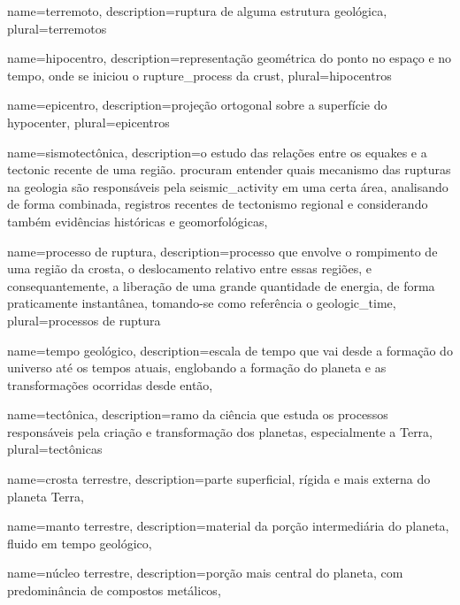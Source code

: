 {
	name={terremoto},
	description={ruptura de alguma estrutura geológica},
	plural={terremotos}
}

{
	name={hipocentro},
	description={representação geométrica do ponto no espaço e no tempo, onde 
		se iniciou o \gls{rupture_process} da \gls{crust}},
	plural={hipocentros}
}

{
	name={epicentro},
	description={projeção ortogonal sobre a superfície do \gls{hypocenter}},
	plural={epicentros}
}


{
	name={sismotectônica},
	description={o estudo das relações entre os \glspl{equake} e a \gls{tectonic} recente de uma região.
				 procuram entender quais mecanismo das rupturas na geologia são responsáveis pela \gls{seismic_activity}
				 em uma certa área, analisando de forma combinada, registros recentes de tectonismo regional e considerando também
				 evidências históricas e geomorfológicas},
}


{
	name={processo de ruptura},
	description={processo que envolve o rompimento de uma região da crosta,
			o deslocamento relativo entre essas regiões, e consequantemente,
			a liberação de uma grande quantidade de energia, de forma praticamente
			instantânea, tomando-se como referência o \gls{geologic_time}},
	plural={processos de ruptura}
}


{
	name={tempo geológico},
	description={escala de tempo que vai desde a formação do universo até os tempos atuais,
				englobando a formação do planeta e as transformações ocorridas desde então},
}


{
	name={tect\^onica},
	description={ramo da ci\^{e}ncia que estuda os processos respons\'aveis 
				 pela cria\c{c}\~ao e transforma\c{c}\~ao dos planetas, 
				 especialmente a Terra},
	plural={tect\^onicas}
}


{
	name={crosta terrestre},
	description={parte superficial, rígida e mais externa do planeta Terra},
}

{
	name={manto terrestre},
	description={material da por{ç}{ã}o intermediária do planeta, 
		fluido em tempo geológico},
}

{
	name={n{ú}cleo terrestre},
	description={por{ç}{ã}o mais central do planeta, com predomin{â}ncia de compostos metálicos},
}

